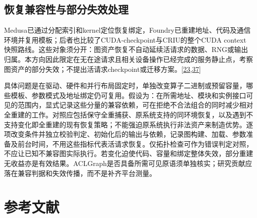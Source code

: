 \documentclass[
  UTF8,
  zihao=5]{ctexart}
\begin{document}
\hypertarget{ux6062ux590dux517cux5bb9ux6027ux4e0eux90e8ux5206ux5931ux6548ux5904ux7406}{%
\subsection*{恢复兼容性与部分失效处理}\label{ux6062ux590dux517cux5bb9ux6027ux4e0eux90e8ux5206ux5931ux6548ux5904ux7406}}

Medusa已通过分配索引和kernel定位恢复绑定，Foundry已重建地址、代码及通信环境并复用模板；后者也比较了CUDA-checkpoint与CRIU的整个CUDA
context快照路线。这些对象须分开：图资产恢复不自动延续活请求的数据、RNG或输出归属。本方向因此限定在无在途请求且相关设备操作已经完成的服务静止点，考察图资产的部分失效；不提出活请求checkpoint或迁移方案。{[}\protect\hyperlink{ref-liu2026foundry}{23},\protect\hyperlink{ref-zeng2025medusa}{37}{]}

具体问题是在驱动、硬件和并行布局固定时，单独改变算子二进制或预留容量，哪些模板、参数模式及地址绑定仍可复用。假设为：在所需地址、模块和实例接口可见的范围内，显式记录这些分量的兼容依赖，可在拒绝不合法组合的同时减少相对全重建的工作。对照应包括保守全重捕获、原系统支持的同环境恢复，以及遇到不支持变化即全重建的现有恢复策略；不能强迫原系统执行非法资产来制造优势。逐项改变条件并独立校验判定、初始化后的输出与依赖，记录图构建、加载、参数准备及前台时间，不用这些指标代表活请求恢复。仅拓扑检查可作为错误判定对照，不应让已知不兼容图实际执行。若变化迫使代码、容量和绑定整体失效，部分重建无收益亦是有效结果。ACLGraph是否具备所需可见原语须单独核实；研究贡献应落在兼容判据和失效传播，而不是补齐平台测量。

\hypertarget{ux53c2ux8003ux6587ux732e}{%
\section*{参考文献}\label{ux53c2ux8003ux6587ux732e}}
\end{document}
